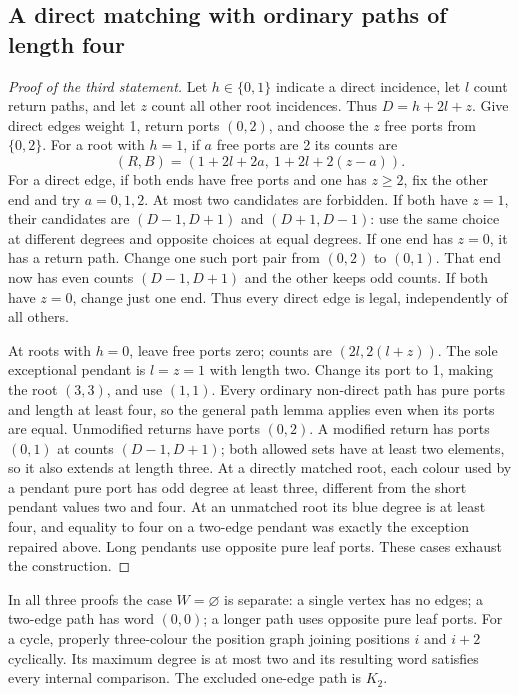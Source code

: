 \subsection{A direct matching with ordinary paths of length four}
\begin{proof}[Proof of the third statement]
Let $h\in\{0,1\}$ indicate a direct incidence, let $l$ count return
paths, and let $z$ count all other root incidences. Thus $D=h+2l+z$.
Give direct edges weight 1, return ports $(0,2)$, and choose the
$z$ free ports from $\{0,2\}$. For a root with $h=1$, if $a$ free
ports are 2 its counts are
\[
 (R,B)=(1+2l+2a,\ 1+2l+2(z-a)).
\]
For a direct edge, if both ends have free ports and one has $z\ge2$,
fix the other end and try $a=0,1,2$. At most two candidates are
forbidden. If both have $z=1$, their candidates are
$(D-1,D+1)$ and $(D+1,D-1)$: use the same choice at different degrees
and opposite choices at equal degrees. If one end has $z=0$, it has
a return path. Change one such port pair from $(0,2)$ to $(0,1)$.
That end now has even counts $(D-1,D+1)$ and the other keeps odd
counts. If both have $z=0$, change just one end. Thus every direct
edge is legal, independently of all others.

At roots with $h=0$, leave free ports zero; counts are
$(2l,2(l+z))$. The sole exceptional pendant is $l=z=1$ with length
two. Change its port to 1, making the root $(3,3)$, and use $(1,1)$.
Every ordinary non-direct path has pure ports and length at least
four, so the general path lemma applies even when its ports are equal.
Unmodified returns have ports $(0,2)$. A modified return has ports
$(0,1)$ at counts $(D-1,D+1)$; both allowed sets have at least two
elements, so it also extends at length three. At a directly matched
root, each colour used by a pendant pure port has odd degree at least
three, different from the short pendant values two and four. At an
unmatched root its blue degree is at least four, and equality to four
on a two-edge pendant was exactly the exception repaired above.
Long pendants use opposite pure leaf ports. These cases exhaust the
construction.
\end{proof}

In all three proofs the case $W=\varnothing$ is separate: a single
vertex has no edges; a two-edge path has word $(0,0)$; a longer path
uses opposite pure leaf ports. For a cycle, properly three-colour the
position graph joining positions $i$ and $i+2$ cyclically. Its maximum
degree is at most two and its resulting word satisfies every internal
comparison. The excluded one-edge path is $K_2$.

